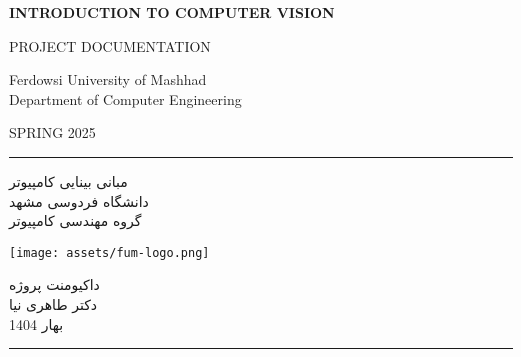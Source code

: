 \documentclass[a4paper,12pt]{article}
\begin{document}
	\begin{latin}
		\begin{titlepage}
			\thispagestyle{empty}
			\pagecolor{titlepagecolor}
			\color{white}
			\begin{center}
				
				{\fontsize{48}{0}\bfseries\selectfont \color{CustomAccent} INTRODUCTION TO COMPUTER VISION}
				
				\baselineskip
				{\fontsize{24}{0}\selectfont PROJECT DOCUMENTATION}
				
				
				{\fontsize{20}{0}\selectfont \color{CustomAccent}
					Ferdowsi University of Mashhad \\
					Department of Computer Engineering
				}
				
				\baselineskip
				{\Large SPRING 2025}
				
			\end{center}
		\end{titlepage}
	\end{latin}
	
	\clearpage
	\nopagecolor
	\pagecolor{CustomBackground}
	\color{white}
	
	\hrule \medskip
	\begin{minipage}{0.295\textwidth}
		\raggedleft \color{CustomAccent}
		مبانی بینایی کامپیوتر\\
		دانشگاه فردوسی مشهد\\
		گروه مهندسی کامپیوتر
	\end{minipage}
	\begin{minipage}{0.4\textwidth}
		\centering 
		\texttt{[image: assets/fum-logo.png]}
	\end{minipage}
	\begin{minipage}{0.295\textwidth} \color{CustomAccent}
		داکیومنت پروژه \\
		دکتر طاهری نیا \\
		بهار 1404
	\end{minipage}
	\medskip\hrule
	\bigskip	
	
\end{document}

